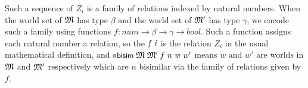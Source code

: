 \documentclass[letterpaper]{article}
\renewcommand{\HOLConst}[1]{{\textsf{\upshape\small #1}}}
\renewcommand{\HOLinline}[1]{\ensuremath{#1}}
\begin{document}
Such a sequence of $Z_i$ is a family of relations indexed by natural numbers. When the world set of \HOLinline{\HOLFreeVar{\ensuremath{\mathfrak{M}}}} has type $\beta$ and the world set of \HOLinline{\HOLFreeVar{\ensuremath{\mathfrak{M}'}}} has type $\gamma$, we encode such a family using functions $f:num\to \beta\to\gamma\to bool$. Such a function assigns each natural number a relation, so the \HOLinline{\HOLFreeVar{f}\;\HOLFreeVar{i}} is the relation $Z_i$ in the usual mathematical definition, and \HOLinline{\HOLConst{nbisim}\;\HOLFreeVar{\ensuremath{\mathfrak{M}}}\;\HOLFreeVar{\ensuremath{\mathfrak{M}'}}\;\HOLFreeVar{f}\;\HOLFreeVar{n}\;\HOLFreeVar{w}\;\HOLFreeVar{w\sp{\prime}}} means $w$ and $w'$ are worlds in \HOLinline{\HOLFreeVar{\ensuremath{\mathfrak{M}}}} and \HOLinline{\HOLFreeVar{\ensuremath{\mathfrak{M}'}}} respectively which are $n$ bisimilar via the family of relations given by $f$.
\end{document}
